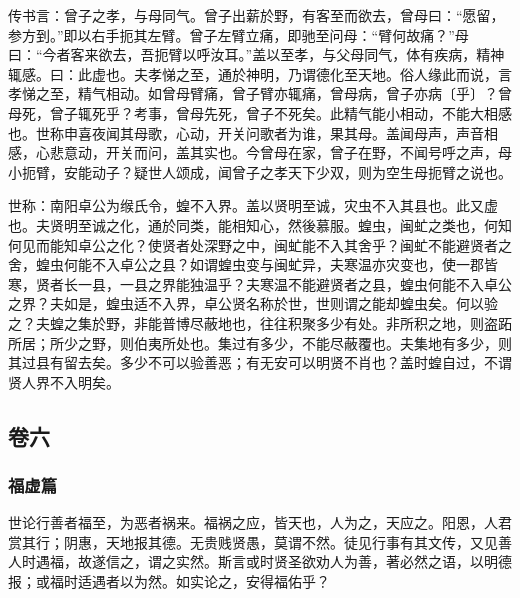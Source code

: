 \documentclass[]{article}
\begin{document}
传书言：曾子之孝，与母同气。曾子出薪於野，有客至而欲去，曾母曰：``愿留，参方到。''即以右手扼其左臂。曾子左臂立痛，即驰至问母：``臂何故痛？''母曰：``今者客来欲去，吾扼臂以呼汝耳。''盖以至孝，与父母同气，体有疾病，精神辄感。曰：此虚也。夫孝悌之至，通於神明，乃谓德化至天地。俗人缘此而说，言孝悌之至，精气相动。如曾母臂痛，曾子臂亦辄痛，曾母病，曾子亦病〔乎〕？曾母死，曾子辄死乎？考事，曾母先死，曾子不死矣。此精气能小相动，不能大相感也。世称申喜夜闻其母歌，心动，开关问歌者为谁，果其母。盖闻母声，声音相感，心悲意动，开关而问，盖其实也。今曾母在家，曾子在野，不闻号呼之声，母小扼臂，安能动子？疑世人颂成，闻曾子之孝天下少双，则为空生母扼臂之说也。

世称：南阳卓公为缑氏令，蝗不入界。盖以贤明至诚，灾虫不入其县也。此又虚也。夫贤明至诚之化，通於同类，能相知心，然後慕服。蝗虫，闽虻之类也，何知何见而能知卓公之化？使贤者处深野之中，闽虻能不入其舍乎？闽虻不能避贤者之舍，蝗虫何能不入卓公之县？如谓蝗虫变与闽虻异，夫寒温亦灾变也，使一郡皆寒，贤者长一县，一县之界能独温乎？夫寒温不能避贤者之县，蝗虫何能不入卓公之界？夫如是，蝗虫适不入界，卓公贤名称於世，世则谓之能却蝗虫矣。何以验之？夫蝗之集於野，非能普博尽蔽地也，往往积聚多少有处。非所积之地，则盗跖所居；所少之野，则伯夷所处也。集过有多少，不能尽蔽覆也。夫集地有多少，则其过县有留去矣。多少不可以验善恶；有无安可以明贤不肖也？盖时蝗自过，不谓贤人界不入明矣。

\hypertarget{header-n209}{%
\subsection{卷六}\label{header-n209}}

\hypertarget{header-n210}{%
\subsubsection{福虚篇}\label{header-n210}}

世论行善者福至，为恶者祸来。福祸之应，皆天也，人为之，天应之。阳恩，人君赏其行；阴惠，天地报其德。无贵贱贤愚，莫谓不然。徒见行事有其文传，又见善人时遇福，故遂信之，谓之实然。斯言或时贤圣欲劝人为善，著必然之语，以明德报；或福时适遇者以为然。如实论之，安得福佑乎？
\end{document}
